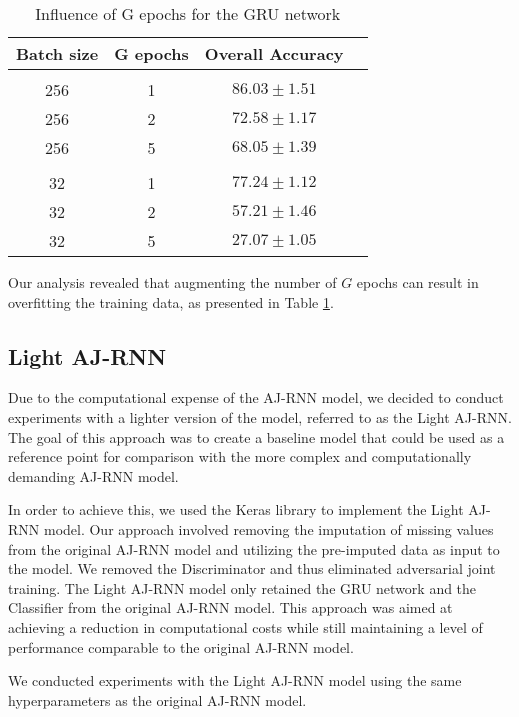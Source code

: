 \begin{table}[H]
  \centering
  \begin{tabular}{cccr} 
      Batch size & G epochs & Overall Accuracy\\[0.2cm] 
      \hline \\[-0.2cm]
      256 &   1 &  $\mathbf{86.03 \pm 1.51}$\\
      256 &   2 &  $72.58 \pm 1.17$\\
      256 &   5 &  $68.05 \pm 1.39$\\[0.05cm] \hline \\[-0.25cm]
      32  &   1 &  $\mathbf{77.24 \pm 1.12}$\\
      32  &   2 &  $57.21 \pm 1.46$\\
      32  &   5 &  $27.07 \pm 1.05$\\
  \end{tabular}
  \caption{Influence of G epochs for the GRU network}
  \label{tab:AJRNNGepochs}
\end{table}

Our analysis revealed that augmenting the number of $G$ epochs can result in overfitting the training data, as presented in Table \ref{tab:AJRNNGepochs}.


\pagebreak
\subsection{Light AJ-RNN}

Due to the computational expense of the AJ-RNN model, we decided to conduct experiments with a lighter version of the model, referred to as the Light AJ-RNN.
The goal of this approach was to create a baseline model that could be used as a reference point for comparison with the more complex and computationally demanding AJ-RNN model. 

In order to achieve this, we used the Keras library to implement the Light AJ-RNN model.
Our approach involved removing the imputation of missing values from the original AJ-RNN model and utilizing the pre-imputed data as input to the model.
We removed the Discriminator and thus eliminated adversarial joint training.
The Light AJ-RNN model only retained the GRU network and the Classifier from the original AJ-RNN model.
This approach was aimed at achieving a reduction in computational costs while still maintaining a level of performance comparable to the original AJ-RNN model.

We conducted experiments with the Light AJ-RNN model using the same hyperparameters as the original AJ-RNN model.



